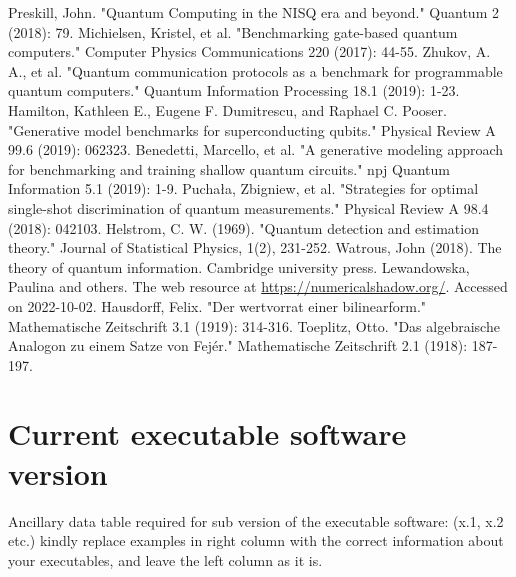 \documentclass[preprint,12pt, a4paper]{elsarticle}
\newcommand{\1}{{\rm 1\hspace{-0.9mm}l}}
\begin{document}
\begin{thebibliography}{00}

 Preskill, John. "Quantum Computing in the NISQ era and 
beyond." Quantum 2 (2018): 79.
 Michielsen, Kristel, et al. "Benchmarking 
gate-based quantum computers." Computer Physics Communications 220 (2017): 
44-55.
 Zhukov, A. A., et al. "Quantum communication 
protocols as a benchmark for programmable quantum computers." Quantum 
Information Processing 18.1 (2019): 1-23.
 Hamilton, Kathleen E., Eugene F. Dumitrescu, 
and Raphael C. Pooser. "Generative model benchmarks for superconducting 
qubits." Physical Review A 99.6 (2019): 062323.
 Benedetti, Marcello, et al. "A generative 
modeling approach for benchmarking and training shallow quantum circuits." npj 
Quantum Information 5.1 (2019): 1-9.
 Puchała, Zbigniew, et al. "Strategies for 
optimal single-shot discrimination of quantum measurements." Physical Review A 
98.4 (2018): 042103.
 Helstrom, C. W. (1969). "Quantum detection and estimation theory." Journal of Statistical Physics, 1(2), 231-252.
 Watrous, John (2018). The theory of quantum information. Cambridge university press.
 Lewandowska, Paulina and others. The web resource at \url{https://numericalshadow.org/}. Accessed on 2022-10-02. 
 Hausdorff, Felix. "Der wertvorrat einer bilinearform." Mathematische Zeitschrift 3.1 (1919): 314-316.
 Toeplitz, Otto. "Das algebraische Analogon zu einem Satze von Fejér." Mathematische Zeitschrift 2.1 (1918): 187-197.
\end{thebibliography}



\section*{Current executable software version}
\label{}

Ancillary data table required for sub version of the executable software: (x.1, 
x.2 etc.) kindly replace examples in right column with the correct information 
about your executables, and leave the left column as it is.
\end{document}
